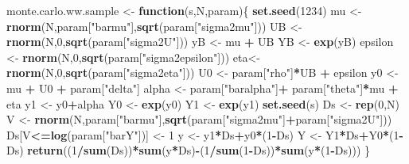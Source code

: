 \documentclass[]{book}
\newenvironment{Shaded}{\begin{snugshade}}{\end{snugshade}}
\newcommand{\KeywordTok}[1]{\textcolor[rgb]{0.13,0.29,0.53}{\textbf{#1}}}
\newcommand{\DecValTok}[1]{\textcolor[rgb]{0.00,0.00,0.81}{#1}}
\newcommand{\StringTok}[1]{\textcolor[rgb]{0.31,0.60,0.02}{#1}}
\newcommand{\ControlFlowTok}[1]{\textcolor[rgb]{0.13,0.29,0.53}{\textbf{#1}}}
\newcommand{\OperatorTok}[1]{\textcolor[rgb]{0.81,0.36,0.00}{\textbf{#1}}}
\newcommand{\NormalTok}[1]{#1}
\theoremstyle{definition}
\theoremstyle{definition}
\theoremstyle{definition}
\theoremstyle{remark}
\begin{document}
\begin{Shaded}
\begin{Highlighting}[]
\NormalTok{monte.carlo.ww.sample <-}\StringTok{ }\ControlFlowTok{function}\NormalTok{(s,N,param)\{}
  \KeywordTok{set.seed}\NormalTok{(}\DecValTok{1234}\NormalTok{)}
\NormalTok{  mu <-}\StringTok{ }\KeywordTok{rnorm}\NormalTok{(N,param[}\StringTok{"barmu"}\NormalTok{],}\KeywordTok{sqrt}\NormalTok{(param[}\StringTok{"sigma2mu"}\NormalTok{]))}
\NormalTok{  UB <-}\StringTok{ }\KeywordTok{rnorm}\NormalTok{(N,}\DecValTok{0}\NormalTok{,}\KeywordTok{sqrt}\NormalTok{(param[}\StringTok{"sigma2U"}\NormalTok{]))}
\NormalTok{  yB <-}\StringTok{ }\NormalTok{mu }\OperatorTok{+}\StringTok{ }\NormalTok{UB }
\NormalTok{  YB <-}\StringTok{ }\KeywordTok{exp}\NormalTok{(yB)}
\NormalTok{  epsilon <-}\StringTok{ }\KeywordTok{rnorm}\NormalTok{(N,}\DecValTok{0}\NormalTok{,}\KeywordTok{sqrt}\NormalTok{(param[}\StringTok{"sigma2epsilon"}\NormalTok{]))}
\NormalTok{  eta<-}\StringTok{ }\KeywordTok{rnorm}\NormalTok{(N,}\DecValTok{0}\NormalTok{,}\KeywordTok{sqrt}\NormalTok{(param[}\StringTok{"sigma2eta"}\NormalTok{]))}
\NormalTok{  U0 <-}\StringTok{ }\NormalTok{param[}\StringTok{"rho"}\NormalTok{]}\OperatorTok{*}\NormalTok{UB }\OperatorTok{+}\StringTok{ }\NormalTok{epsilon}
\NormalTok{  y0 <-}\StringTok{ }\NormalTok{mu }\OperatorTok{+}\StringTok{  }\NormalTok{U0 }\OperatorTok{+}\StringTok{ }\NormalTok{param[}\StringTok{"delta"}\NormalTok{]}
\NormalTok{  alpha <-}\StringTok{ }\NormalTok{param[}\StringTok{"baralpha"}\NormalTok{]}\OperatorTok{+}\StringTok{  }\NormalTok{param[}\StringTok{"theta"}\NormalTok{]}\OperatorTok{*}\NormalTok{mu }\OperatorTok{+}\StringTok{ }\NormalTok{eta}
\NormalTok{  y1 <-}\StringTok{ }\NormalTok{y0}\OperatorTok{+}\NormalTok{alpha}
\NormalTok{  Y0 <-}\StringTok{ }\KeywordTok{exp}\NormalTok{(y0)}
\NormalTok{  Y1 <-}\StringTok{ }\KeywordTok{exp}\NormalTok{(y1)}
  \KeywordTok{set.seed}\NormalTok{(s)}
\NormalTok{  Ds <-}\StringTok{ }\KeywordTok{rep}\NormalTok{(}\DecValTok{0}\NormalTok{,N)}
\NormalTok{  V <-}\StringTok{ }\KeywordTok{rnorm}\NormalTok{(N,param[}\StringTok{"barmu"}\NormalTok{],}\KeywordTok{sqrt}\NormalTok{(param[}\StringTok{"sigma2mu"}\NormalTok{]}\OperatorTok{+}\NormalTok{param[}\StringTok{"sigma2U"}\NormalTok{]))}
\NormalTok{  Ds[V}\OperatorTok{<=}\KeywordTok{log}\NormalTok{(param[}\StringTok{"barY"}\NormalTok{])] <-}\StringTok{ }\DecValTok{1} 
\NormalTok{  y <-}\StringTok{ }\NormalTok{y1}\OperatorTok{*}\NormalTok{Ds}\OperatorTok{+}\NormalTok{y0}\OperatorTok{*}\NormalTok{(}\DecValTok{1}\OperatorTok{-}\NormalTok{Ds)}
\NormalTok{  Y <-}\StringTok{ }\NormalTok{Y1}\OperatorTok{*}\NormalTok{Ds}\OperatorTok{+}\NormalTok{Y0}\OperatorTok{*}\NormalTok{(}\DecValTok{1}\OperatorTok{-}\NormalTok{Ds)}
  \KeywordTok{return}\NormalTok{((}\DecValTok{1}\OperatorTok{/}\KeywordTok{sum}\NormalTok{(Ds))}\OperatorTok{*}\KeywordTok{sum}\NormalTok{(y}\OperatorTok{*}\NormalTok{Ds)}\OperatorTok{-}\NormalTok{(}\DecValTok{1}\OperatorTok{/}\KeywordTok{sum}\NormalTok{(}\DecValTok{1}\OperatorTok{-}\NormalTok{Ds))}\OperatorTok{*}\KeywordTok{sum}\NormalTok{(y}\OperatorTok{*}\NormalTok{(}\DecValTok{1}\OperatorTok{-}\NormalTok{Ds)))}
\NormalTok{\}}


\end{Highlighting}
\end{Shaded}
\end{document}
